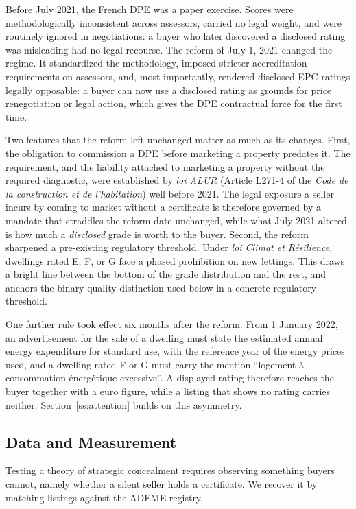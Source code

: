 Before July 2021, the French DPE was a paper exercise. Scores were methodologically inconsistent across assessors, carried no legal weight, and were routinely ignored in negotiations: a buyer who later discovered a disclosed rating was misleading had no legal recourse. The reform of July 1, 2021 changed the regime. It standardized the methodology, imposed stricter accreditation requirements on assessors, and, most importantly, rendered disclosed EPC ratings legally opposable: a buyer can now use a disclosed rating as grounds for price renegotiation or legal action, which gives the DPE contractual force for the first time.

Two features that the reform left unchanged matter as much as its changes. First, the obligation to
commission a DPE before marketing a property predates it. The requirement, and the liability
attached to marketing a property without the required diagnostic, were established by \emph{loi
ALUR} (Article L271-4 of the \emph{Code de la construction et de l'habitation}) well before 2021.
The legal exposure a seller incurs by coming to market without a certificate is therefore governed
by a mandate that straddles the reform date unchanged, while what July 2021 altered is how much a
\emph{disclosed} grade is worth to the buyer. Second, the reform sharpened a pre-existing
regulatory threshold. Under \emph{loi Climat et R\'esilience}, dwellings
rated E, F, or G face a phased prohibition on new lettings. This draws a bright line between the
bottom of the grade distribution and the rest, and anchors the binary quality distinction used below
in a concrete regulatory threshold.

One further rule took effect six months after the reform. From 1 January 2022, an advertisement for the sale of a dwelling must state the estimated annual energy expenditure for standard use, with the reference year of the energy prices used, and a dwelling rated F or G must carry the mention ``logement \`a consommation \'energ\'etique excessive''. A displayed rating therefore reaches the buyer together with a euro figure, while a listing that shows no rating carries neither. Section~\ref{ss:attention} builds on this asymmetry.

\subsection{Data and Measurement}
\label{sec:data}

Testing a theory of strategic concealment requires observing something buyers cannot, namely whether
a silent seller holds a certificate. We recover it by matching listings against the ADEME registry.

